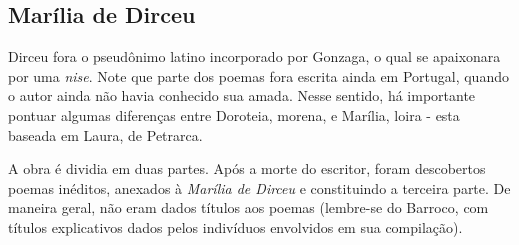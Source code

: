 \documentclass[12pt]{book}
\begin{document}
				\subsection{Marília de Dirceu}
				\par Dirceu fora o pseudônimo latino incorporado por Gonzaga, o qual se apaixonara por uma \textit{nise}. Note que parte dos poemas fora escrita ainda em Portugal, quando o autor ainda não havia conhecido sua amada. Nesse sentido, há importante pontuar algumas diferenças entre Doroteia, morena, e Marília, loira - esta baseada em Laura, de Petrarca.
				\par A obra é dividia em duas partes. Após a morte do escritor, foram descobertos poemas inéditos, anexados à \textit{Marília de Dirceu} e constituindo a terceira parte. De maneira geral, não eram dados títulos aos poemas (lembre-se do Barroco, com títulos explicativos dados pelos indivíduos envolvidos em sua compilação).
				\settowidth{\versewidth}{Que viva de guardar alheio gado;}
\end{document}
